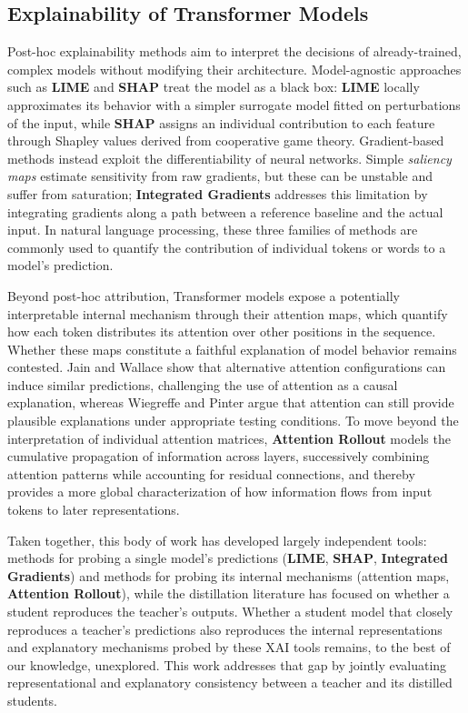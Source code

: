 \documentclass[conference]{IEEEtran}
\begin{document}
\subsection{Explainability of Transformer Models}

Post-hoc explainability methods aim to interpret the decisions of already-trained, complex models without modifying their architecture. Model-agnostic approaches such as \textbf{LIME} \cite{ribeiro2016should} and \textbf{SHAP} \cite{lundberg2017unified} treat the model as a black box: \textbf{LIME} locally approximates its behavior with a simpler surrogate model fitted on perturbations of the input, while \textbf{SHAP} assigns an individual contribution to each feature through Shapley values derived from cooperative game theory. Gradient-based methods instead exploit the differentiability of neural networks. Simple \textit{saliency maps} estimate sensitivity from raw gradients, but these can be unstable and suffer from saturation; \textbf{Integrated Gradients} \cite{sundararajan2017axiomatic} addresses this limitation by integrating gradients along a path between a reference baseline and the actual input. In natural language processing, these three families of methods are commonly used to quantify the contribution of individual tokens or words to a model's prediction.

Beyond post-hoc attribution, Transformer models expose a potentially interpretable internal mechanism through their attention maps, which quantify how each token distributes its attention over other positions in the sequence. Whether these maps constitute a faithful explanation of model behavior remains contested. Jain and Wallace \cite{jain2019attention} show that alternative attention configurations can induce similar predictions, challenging the use of attention as a causal explanation, whereas Wiegreffe and Pinter \cite{wiegreffe2019attention} argue that attention can still provide plausible explanations under appropriate testing conditions. To move beyond the interpretation of individual attention matrices, \textbf{Attention Rollout} \cite{abnar2020quantifying} models the cumulative propagation of information across layers, successively combining attention patterns while accounting for residual connections, and thereby provides a more global characterization of how information flows from input tokens to later representations.

Taken together, this body of work has developed largely independent tools: methods for probing a single model's predictions (\textbf{LIME}, \textbf{SHAP}, \textbf{Integrated Gradients}) and methods for probing its internal mechanisms (attention maps, \textbf{Attention Rollout}), while the distillation literature has focused on whether a student reproduces the teacher's outputs. Whether a student model that closely reproduces a teacher's predictions also reproduces the internal representations and explanatory mechanisms probed by these XAI tools remains, to the best of our knowledge, unexplored. This work addresses that gap by jointly evaluating representational and explanatory consistency between a teacher and its distilled students.
\end{document}

